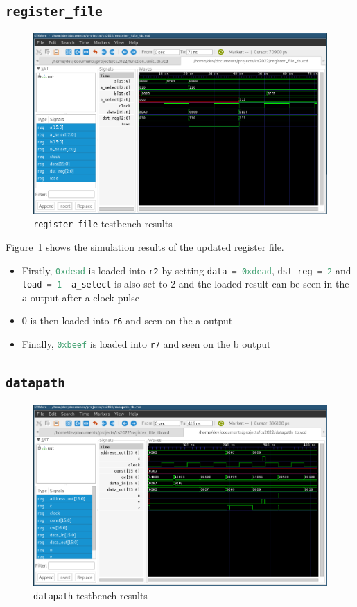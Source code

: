 \documentclass[a4paper]{article}
\numberwithin{figure}{section}
\numberwithin{table}{section}
\newcommand{\mi}{\mintinline}
\begin{document}
\subsection{\mi{c}{register_file}}
\begin{figure}[h!]
	\centering
	\includegraphics[width=\textwidth]{register_file_tb}
	\caption{\mi{c}{register_file} testbench results}
	\label{fig:regs}
\end{figure}

Figure~\ref{fig:regs} shows the simulation results of the updated register file.
\begin{itemize}
	\item Firstly, \mi{c}{0xdead} is loaded into \mi{c}{r2} by setting \mi{c}{data = 0xdead}, \mi{c}{dst_reg = 2} and \mi{c}{load = 1} - \mi{c}{a_select} is also set to 2 and the loaded result can be seen in the \mi{c}{a} output after a clock pulse
	\item 0 is then loaded into \mi{c}{r6} and seen on the a output
	\item Finally, \mi{c}{0xbeef} is loaded into \mi{c}{r7} and seen on the b output
\end{itemize}

\newpage
\subsection{\mi{c}{datapath}}
\begin{figure}[h!]
	\centering
	\includegraphics[width=\textwidth]{datapath_tb}
	\caption{\mi{c}{datapath} testbench results}
	\label{fig:datapath}
\end{figure}
\end{document}
